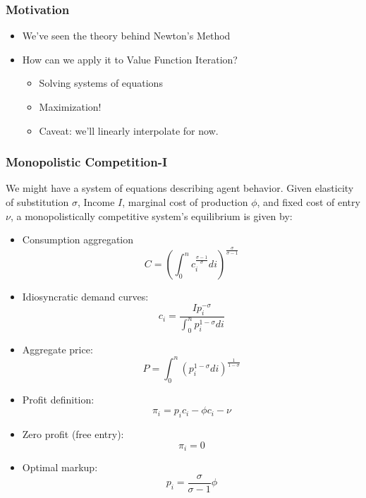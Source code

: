 \documentclass{beamer}
\author{Trevor Gallen}
\date{}
\begin{document}
\begin{frame}
\titlepage
\end{frame}

\begin{frame}
\frametitle[alignment=center]{Motivation}
\begin{itemize}
\item We've seen the theory behind Newton's Method
\bigskip
\item How can we apply it to Value Function Iteration?
\bigskip
\begin{itemize}
\item Solving systems of equations
\bigskip
\item Maximization!
\bigskip
\item Caveat:  we'll linearly interpolate for now.
\end{itemize}
\end{itemize}
\end{frame}

\begin{frame}
\frametitle[alignment=center]{Monopolistic Competition-I}
\scriptsize
We might have a system of equations describing agent behavior.  Given elasticity of substitution $\sigma$, Income $I$, marginal cost of production $\phi$, and fixed cost of entry $\nu$, a monopolistically competitive system's equilibrium is given by: \bigskip
\begin{itemize}
\item Consumption aggregation
\begin{equation}C=\left(\int_0^nc_i^\frac{\sigma-1}{\sigma}di\right)^\frac{\sigma}{\sigma-1}\end{equation}
\item Idiosyncratic demand curves:
\begin{equation}c_i=\frac{Ip_i^{-\sigma}}{\int_0^np_i^{1-\sigma}di}\end{equation}
\item Aggregate price:
\begin{equation}P=\int_0^n\left(p_i^{1-\sigma}di\right)^\frac{1}{1-\sigma}\end{equation}
\item Profit definition:
\begin{equation}\pi_i = p_ic_i-\phi c_i - \nu\end{equation}
\item Zero profit (free entry):
\begin{equation}\pi_i=0\end{equation}
\item Optimal markup:
\begin{equation}p_i=\frac{\sigma}{\sigma-1}\phi\end{equation}
\end{itemize}
\end{frame}
\end{document}
